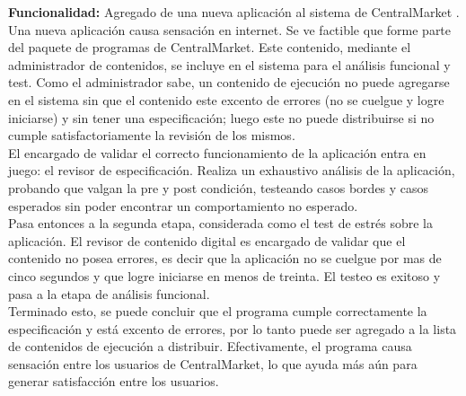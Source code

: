 \documentclass[11pt, a4paper, spanish]{article}
\begin{document}
	\textbf{Funcionalidad:} Agregado de una nueva aplicaci\'on al sistema de CentralMarket .\\

	Una nueva aplicaci\'on causa sensaci\'on en internet. Se ve factible que forme parte del paquete de programas de CentralMarket. Este contenido, 
   mediante el administrador de contenidos, se incluye en el sistema para el an\'alisis funcional y test. Como el administrador sabe, un contenido de 
   ejecuci\'on no puede agregarse en el sistema sin que el contenido este excento de errores (no se cuelgue y logre iniciarse) y sin tener una 
   especificaci\'on; luego este no puede distribuirse si no cumple satisfactoriamente la revisi\'on de los mismos.\\

	El encargado de validar el correcto funcionamiento de la aplicaci\'on entra en juego: el revisor de especificaci\'on. Realiza un exhaustivo 
   an\'alisis de la aplicaci\'on, probando que valgan la pre y post condici\'on, testeando casos bordes y casos esperados sin poder encontrar un 
   comportamiento no esperado.\\

	Pasa entonces a la segunda etapa, considerada como el test de estr\'es sobre la aplicaci\'on. El revisor de contenido digital es encargado de 
   validar que el contenido no posea errores, es decir que la aplicaci\'on no se cuelgue por mas de cinco segundos y que logre iniciarse en menos de 
   treinta. El testeo es exitoso y pasa a la etapa de an\'alisis funcional.\\

	Terminado esto, se puede concluir que el programa cumple correctamente la especificaci\'on y est\'a excento de errores, por lo tanto puede ser 
   agregado a la lista de contenidos de ejecuci\'on a distribuir.
        Efectivamente, el programa causa sensaci\'on entre los usuarios de CentralMarket, lo que ayuda m\'as a\'un para generar satisfacci\'on entre los 
   usuarios.
\end{document}
